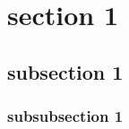\section{section 1} \label{sec1}

\subsection{subsection 1} \label{sec1:1}

\subsubsection{subsubsection 1} \label{sec1:1:1}